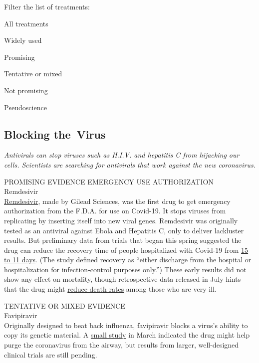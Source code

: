 Filter the list of treatments:

All treatments

Widely used

Promising

Tentative or mixed

Not promising

Pseudoscience

\hypertarget{blocking-the-virus}{%
\subsection{Blocking the~Virus}\label{blocking-the-virus}}

\emph{Antivirals can stop viruses such as H.I.V. and hepatitis C from
hijacking our cells. Scientists are searching for antivirals that work
against the new coronavirus.}

PROMISING EVIDENCE EMERGENCY USE AUTHORIZATION\\
Remdesivir\\
\href{https://www.nytimes.com/2020/05/23/health/coronavirus-remdesivir.html}{Remdesivir},
made by Gilead Sciences, was the first drug to get emergency
authorization from the F.D.A. for use on Covid-19. It stops viruses from
replicating by inserting itself into new viral genes. Remdesivir was
originally tested as an antiviral against Ebola and Hepatitis C, only to
deliver lackluster results. But preliminary data from trials that began
this spring suggested the drug can reduce the recovery time of people
hospitalized with Covid-19 from
\href{https://www.nejm.org/doi/full/10.1056/NEJMoa2007764}{15 to 11
days}. (The study defined recovery as ``either discharge from the
hospital or hospitalization for infection-control purposes only.'')
These early results did not show any effect on mortality, though
retrospective data released in July hints that the drug might
\href{https://www.gilead.com/news-and-press/press-room/press-releases/2020/7/gilead-presents-additional-data-on-investigational-antiviral-remdesivir-for-the-treatment-of-covid-19}{reduce
death rates} among those who are very ill.

TENTATIVE OR MIXED EVIDENCE\\
Favipiravir\\
Originally designed to beat back influenza, favipiravir blocks a virus's
ability to copy its genetic material. A
\href{https://www.sciencedirect.com/science/article/pii/S2095809920300631?via\%3Dihub}{small
study} in March indicated the drug might help purge the coronavirus from
the airway, but results from larger, well-designed clinical trials are
still pending.

